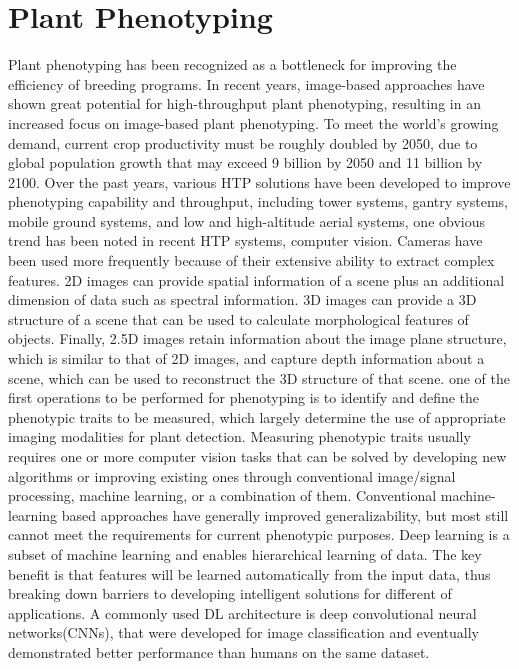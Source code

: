 

\section{Plant Phenotyping}

Plant phenotyping has been recognized as a bottleneck \cite{4152816} for improving the efficiency of breeding programs. In recent years, image-based approaches
have shown great potential for high-throughput plant phenotyping, resulting in an increased focus on image-based plant phenotyping.
To meet the world's growing demand, current crop productivity must be roughly doubled by 2050, due to global population growth that may exceed
9 billion by 2050 and 11 billion by 2100. Over the past years, various HTP solutions have been developed to improve phenotyping capability
and throughput, including tower systems, gantry systems, mobile ground systems, and low and high-altitude aerial systems, one obvious trend
has been noted in recent HTP systems, computer vision. Cameras have been used more frequently because of their extensive ability to extract
complex features. 2D images can provide spatial information of a scene plus an additional dimension of data such as spectral information.
3D images can provide a 3D structure of a scene that can be used to calculate morphological features of objects. Finally, 2.5D images retain
information about the image plane structure, which is similar to that of 2D images, and capture depth information about a scene, which can
be used to reconstruct the 3D structure of that scene. one of the first operations to be performed for phenotyping is to identify and
define the phenotypic traits to be measured, which largely determine the use of appropriate imaging modalities for plant detection.
Measuring phenotypic traits usually requires one or more computer vision tasks that can be solved by developing new algorithms or
improving existing ones through conventional image/signal processing, machine learning, or a combination of them. Conventional machine-learning
based approaches have generally improved generalizability, but most still cannot meet the requirements for current phenotypic purposes.
Deep learning is a subset of machine learning and enables hierarchical learning of data. The key benefit is that features will be learned
automatically from the input data, thus breaking down barriers to developing intelligent solutions for different of applications.
A commonly used DL architecture is deep convolutional neural networks(CNNs), that were developed for image classification and eventually
demonstrated better performance than humans on the same dataset.

